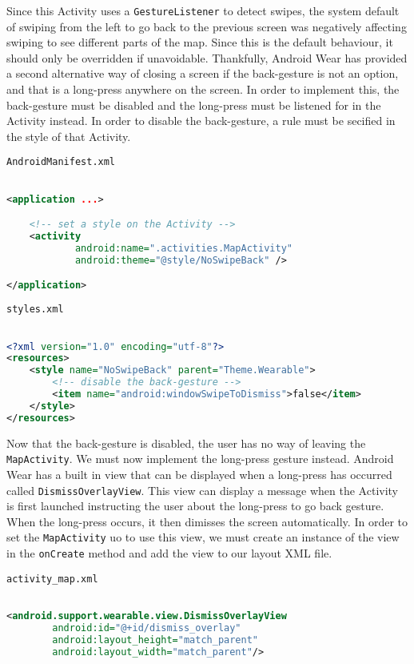Since this Activity uses a \texttt{GestureListener} to detect swipes, the
system default of swiping from the left to go back to the previous screen was
negatively affecting swiping to see different parts of the map. Since this is
the default behaviour, it should only be overridden if unavoidable. Thankfully,
Android Wear has provided a second alternative way of closing a screen if the
back-gesture is not an option, and that is a long-press anywhere on the screen.
In order to implement this, the back-gesture must be disabled and the long-press
must be listened for in the Activity instead. In order to disable the
back-gesture, a rule must be secified in the style of that Activity.

\texttt{AndroidManifest.xml}
\begin{lstlisting}[language=XML]

<application ...>

    <!-- set a style on the Activity -->
    <activity
            android:name=".activities.MapActivity"
            android:theme="@style/NoSwipeBack" />

</application>

\end{lstlisting}

\texttt{styles.xml}
\begin{lstlisting}[language=XML]

<?xml version="1.0" encoding="utf-8"?>
<resources>
    <style name="NoSwipeBack" parent="Theme.Wearable">
        <!-- disable the back-gesture -->
        <item name="android:windowSwipeToDismiss">false</item>
    </style>
</resources>

\end{lstlisting}

Now that the back-gesture is disabled, the user has no way of leaving the
\texttt{MapActivity}. We must now implement the long-press gesture instead.
Android Wear has a built in view that can be displayed when a long-press has
occurred called \texttt{DismissOverlayView}. This view can display a message
when the Activity is first launched instructing the user about the long-press
to go back gesture. When the long-press occurs, it then dimisses the screen
automatically. In order to set the \texttt{MapActivity} uo to use this view, we
must create an instance of the view in the \texttt{onCreate} method and add
the view to our layout XML file.

\texttt{activity\_map.xml}
\begin{lstlisting}[language=XML]

<android.support.wearable.view.DismissOverlayView
        android:id="@+id/dismiss_overlay"
        android:layout_height="match_parent"
        android:layout_width="match_parent"/>

\end{lstlisting}

